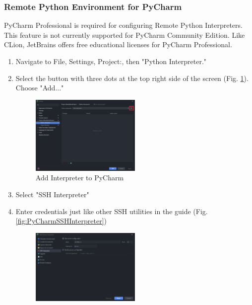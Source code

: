         \subsubsection{Remote Python Environment for PyCharm}
        PyCharm Professional is required for configuring Remote Python Interpreters. This feature is not currently supported for PyCharm Community Edition. Like CLion, JetBrains offers free educational licenses for PyCharm Professional. 
        \begin{enumerate}
            \item Navigate to File, Settings, Project:, then "Python Interpreter."
            \item Select the button with three dots at the top right side of the screen (Fig. \ref{fig:PyCharmAddInterpreter}). Choose "Add..."
            \begin{figure}[H]
                \centering
                \includegraphics[width=0.5\textwidth]{images/beagleboneblack_truckcape_v4_images/PyCharmInterpreter.png}
                \caption{Add Interpreter to PyCharm}
                \label{fig:PyCharmAddInterpreter}
            \end{figure}
            \item Select "SSH Interpreter"
            \item Enter credentials just like other SSH utilities in the guide (Fig. \ref{fig:PyCharmSSHInterpreter})
            \begin{figure}[H]
                \centering
                \includegraphics[width=0.5\textwidth]{images/beagleboneblack_truckcape_v4_images/PycharmSSHInterpreterCredentials.png}

\end{figure}
\end{enumerate}
